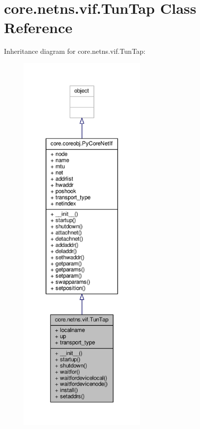 \hypertarget{classcore_1_1netns_1_1vif_1_1_tun_tap}{\section{core.\+netns.\+vif.\+Tun\+Tap Class Reference}
\label{classcore_1_1netns_1_1vif_1_1_tun_tap}
}


Inheritance diagram for core.\+netns.\+vif.\+Tun\+Tap\+:
\nopagebreak
\begin{figure}[H]
\begin{center}
\leavevmode
\includegraphics[height=550pt]{classcore_1_1netns_1_1vif_1_1_tun_tap__inherit__graph}
\end{center}
\end{figure}



